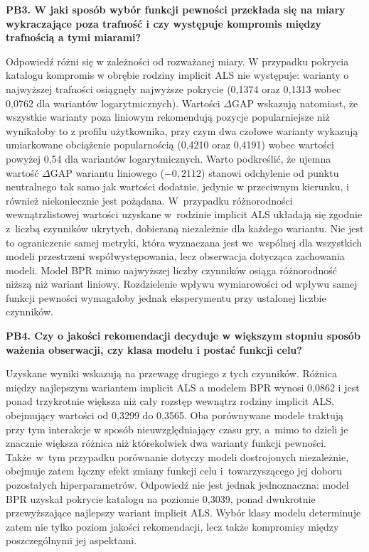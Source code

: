\textbf{PB3. W jaki sposób wybór funkcji pewności przekłada się na miary wykraczające poza trafność i czy występuje kompromis między trafnością a tymi miarami?}

Odpowiedź różni się w zależności od rozważanej miary. W przypadku pokrycia katalogu kompromis w obrębie rodziny implicit ALS nie występuje: warianty o najwyższej trafności osiągnęły najwyższe pokrycie (0,1374 oraz 0,1313 wobec 0,0762 dla wariantów logarytmicznych). Wartości $\Delta$GAP wskazują natomiast, że wszystkie warianty poza liniowym rekomendują pozycje popularniejsze niż wynikałoby to z profilu użytkownika, przy czym dwa czołowe warianty wykazują umiarkowane obciążenie popularnością (0,4210 oraz 0,4191) wobec wartości powyżej 0,54 dla wariantów logarytmicznych. Warto podkreślić, że ujemna wartość $\Delta$GAP wariantu liniowego ($-0{,}2112$) stanowi odchylenie od punktu neutralnego tak samo jak wartości dodatnie, jedynie w przeciwnym kierunku, i również niekoniecznie jest pożądana. W~przypadku różnorodności wewnątrzlistowej wartości uzyskane w~rodzinie implicit ALS układają się zgodnie z~liczbą czynników ukrytych, dobieraną niezależnie dla każdego wariantu. Nie jest to ograniczenie samej metryki, która wyznaczana jest we~wspólnej dla wszystkich modeli przestrzeni współwystępowania, lecz obserwacja dotycząca zachowania modeli. Model BPR mimo najwyższej liczby czynników osiąga różnorodność niższą niż wariant liniowy. Rozdzielenie wpływu wymiarowości od wpływu samej funkcji pewności wymagałoby jednak eksperymentu przy ustalonej liczbie czynników.

\textbf{PB4. Czy o jakości rekomendacji decyduje w większym stopniu sposób ważenia obserwacji, czy klasa modelu i postać funkcji celu?}

Uzyskane wyniki wskazują na przewagę drugiego z tych czynników. Różnica \ndcg{} między najlepszym wariantem implicit ALS a modelem BPR wynosi 0,0862 i jest ponad trzykrotnie większa niż cały rozstęp wewnątrz rodziny implicit ALS, obejmujący wartości od 0,3299 do 0,3565. Oba porównywane modele traktują przy tym interakcje w sposób nieuwzględniający czasu gry, a~mimo to dzieli je znacznie większa różnica niż którekolwiek dwa warianty funkcji pewności. Także~w~tym przypadku porównanie dotyczy modeli dostrojonych niezależnie, obejmuje zatem łączny efekt zmiany funkcji celu i~towarzyszącego jej doboru pozostałych hiperparametrów. Odpowiedź nie jest jednak jednoznaczna: model BPR uzyskał pokrycie katalogu na poziomie 0,3039, ponad dwukrotnie przewyższające najlepszy wariant implicit ALS. Wybór klasy modelu determinuje zatem nie tylko poziom jakości rekomendacji, lecz także kompromisy między poszczególnymi jej aspektami.

